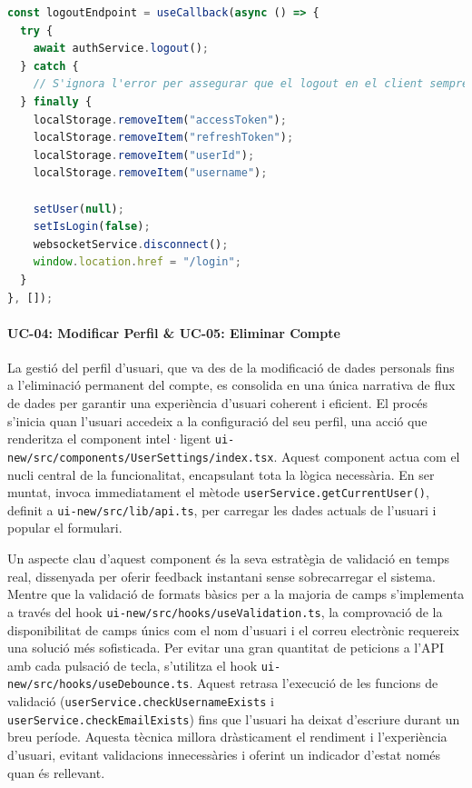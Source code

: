 \begin{lstlisting}[language=javascript, caption={Funció `logoutEndpoint` al hook `userAuth.tsx`}]
const logoutEndpoint = useCallback(async () => {
  try {
    await authService.logout();
  } catch {
    // S'ignora l'error per assegurar que el logout en el client sempre ocorri
  } finally {
    localStorage.removeItem("accessToken");
    localStorage.removeItem("refreshToken");
    localStorage.removeItem("userId");
    localStorage.removeItem("username");
    
    setUser(null);
    setIsLogin(false);
    websocketService.disconnect();
    window.location.href = "/login";
  }
}, []);
\end{lstlisting}

\paragraph{UC-04: Modificar Perfil \& UC-05: Eliminar Compte}
La gestió del perfil d'usuari, que va des de la modificació de dades personals fins a l'eliminació permanent del compte, es consolida en una única narrativa de flux de dades per garantir una experiència d'usuari coherent i eficient. El procés s'inicia quan l'usuari accedeix a la configuració del seu perfil, una acció que renderitza el component intel·ligent \texttt{ui-new/src/components/UserSettings/index.tsx}. Aquest component actua com el nucli central de la funcionalitat, encapsulant tota la lògica necessària. En ser muntat, invoca immediatament el mètode \texttt{userService.getCurrentUser()}, definit a \texttt{ui-new/src/lib/api.ts}, per carregar les dades actuals de l'usuari i popular el formulari.

Un aspecte clau d'aquest component és la seva estratègia de validació en temps real, dissenyada per oferir feedback instantani sense sobrecarregar el sistema. Mentre que la validació de formats bàsics per a la majoria de camps s'implementa a través del hook \texttt{ui-new/src/hooks/useValidation.ts}, la comprovació de la disponibilitat de camps únics com el nom d'usuari i el correu electrònic requereix una solució més sofisticada. Per evitar una gran quantitat de peticions a l'API amb cada pulsació de tecla, s'utilitza el hook \texttt{ui-new/src/hooks/useDebounce.ts}. Aquest retrasa l'execució de les funcions de validació (\texttt{userService.checkUsernameExists} i \texttt{userService.checkEmailExists}) fins que l'usuari ha deixat d'escriure durant un breu període. Aquesta tècnica millora dràsticament el rendiment i l'experiència d'usuari, evitant validacions innecessàries i oferint un indicador d'estat només quan és rellevant.

